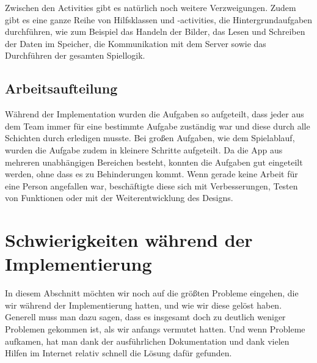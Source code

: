 Zwischen den Activities gibt es natürlich noch weitere Verzweigungen. Zudem gibt es eine ganze Reihe von Hilfsklassen und -activities, die Hintergrundaufgaben durchführen, wie zum Beispiel das Handeln der Bilder, das Lesen und Schreiben der Daten im Speicher, die Kommunikation mit dem Server sowie das Durchführen der gesamten Spiellogik.

\subsection{Arbeitsaufteilung}
\label{sec:implementierung:architektur:arbeitsaufteilung }

Während der Implementation wurden die Aufgaben so aufgeteilt, dass jeder aus dem Team immer für eine bestimmte Aufgabe zuständig war und diese durch alle Schichten durch erledigen musste. Bei großen Aufgaben, wie dem Spielablauf, wurden die Aufgabe zudem in kleinere Schritte aufgeteilt. Da die App aus mehreren unabhängigen Bereichen besteht, konnten die Aufgaben gut eingeteilt werden, ohne dass es zu Behinderungen kommt. Wenn gerade keine Arbeit für eine Person angefallen war, beschäftigte diese sich mit Verbesserungen, Testen von Funktionen oder mit der Weiterentwicklung des Designs.

\section{Schwierigkeiten während der Implementierung}
\label{sec:implementierung:schwierigkeiten }	

In diesem Abschnitt möchten wir noch auf die größten Probleme eingehen, die wir während der Implementierung hatten, und wie wir diese gelöst haben. Generell muss man dazu sagen, dass es insgesamt doch zu deutlich weniger Problemen gekommen ist, als wir anfangs vermutet hatten. Und wenn Probleme aufkamen, hat man dank der ausführlichen Dokumentation und dank vielen Hilfen im Internet relativ schnell die Lösung dafür gefunden.

